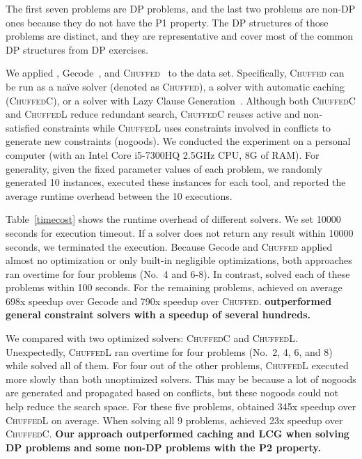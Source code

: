 The first seven problems are DP problems, and the last two problems are non-DP ones because they do not have the P1 property. The DP structures of those problems are distinct, and they are representative and cover most of the common DP structures from DP exercises.

We applied \tool, Gecode~\cite{schulte2006gecode}, and \textsc{Chuffed}~\cite{chu2012exploiting} to the data set. Specifically,
\textsc{Chuffed} can be run as a na\"ive solver (denoted as \textsc{Chuffed}), a solver with automatic caching (\textsc{ChuffedC}), or a solver with Lazy Clause Generation~\cite{ohrimenko2009propagation}. Although both \textsc{ChuffedC} and \textsc{ChuffedL} reduce redundant search, \textsc{ChuffedC} reuses active and non-satisfied constraints while \textsc{ChuffedL} uses constraints involved in conflicts to generate new constraints (nogoods). 
We conducted the experiment 
on a personal computer (with an Intel Core i5-7300HQ 2.5GHz CPU, 8G of RAM). For generality, given the fixed parameter values of each problem, we randomly generated 10 instances, executed these instances for each tool, and reported the average runtime overhead between the 10 executions.

Table~\ref{timecost} shows the runtime overhead of different solvers. 
We set 10000 seconds for execution timeout. If a solver does not return any result within 10000 seconds, we terminated the execution. Because Gecode and \textsc{Chuffed} applied almost no optimization or only built-in negligible optimizations, both approaches ran overtime for four problems (No.~4 and 6-8). In contrast, \tool solved each of these problems within 100 seconds. 
For the remaining problems, \tool achieved on average 698x speedup over Gecode and 790x speedup over \textsc{Chuffed}. \textbf{\tool outperformed general constraint solvers with a speedup of several hundreds. }

We compared \tool with two optimized solvers: \textsc{ChuffedC} and \textsc{ChuffedL}. Unexpectedly, \textsc{ChuffedL} ran overtime for four problems (No.~2, 4, 6, and 8) while \tool solved all of them. 
For four out of the other problems, \textsc{ChuffedL} executed more slowly than both unoptimized solvers. This may be because a lot of nogoods are generated and propagated based on conflicts, but these nogoods could not help reduce the search space. 
For these five problems, \tool obtained 345x speedup over \textsc{ChuffedL} on average.
When solving all 9 problems, \tool achieved 23x speedup
over \textsc{ChuffedC}. %
\textbf{Our approach outperformed caching and LCG when solving DP problems and some non-DP problems with the P2 property.}

